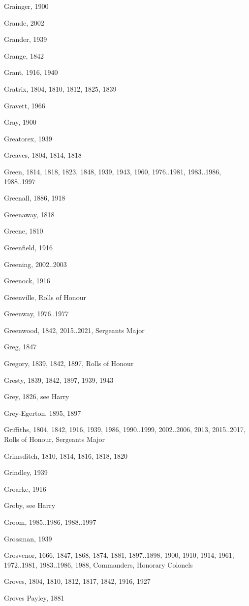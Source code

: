 {\begin{theindex}
\item Grainger, 1900
\item Grande, 2002
\item Grander, 1939
\item Grange, 1842
\item Grant, 1916, 1940
\item Gratrix, 1804, 1810, 1812, 1825, 1839
\item Gravett, 1966
\item Gray, 1900
\item Greatorex, 1939
\item Greaves, 1804, 1814, 1818
\item Green, 1814, 1818, 1823, 1848, 1939, 1943, 1960, 1976..1981, 1983..1986, 1988..1997
\item Greenall, 1886, 1918
\item Greenaway, 1818
\item Greene, 1810
\item Greenfield, 1916
\item Greening, 2002..2003
\item Greenock, 1916
\item Greenville, Rolls of Honour
\item Greenway, 1976..1977
\item Greenwood, 1842, 2015..2021, Sergeants Major
\item Greg, 1847
\item Gregory, 1839, 1842, 1897, Rolls of Honour
\item Gresty, 1839, 1842, 1897, 1939, 1943
\item Grey, 1826, see Harry
\item Grey-Egerton, 1895, 1897
\item Griffiths, 1804, 1842, 1916, 1939, 1986, 1990..1999, 2002..2006, 2013, 2015..2017, Rolls of Honour, Sergeants Major
\item Grimsditch, 1810, 1814, 1816, 1818, 1820
\item Grindley, 1939
\item Groarke, 1916
\item Groby, see Harry
\item Groom, 1985..1986, 1988..1997
\item Grossman, 1939
\item Grosvenor, 1666, 1847, 1868, 1874, 1881, 1897..1898, 1900, 1910, 1914, 1961, 1972..1981, 1983..1986, 1988, Commanders, Honorary Colonels
\item Groves, 1804, 1810, 1812, 1817, 1842, 1916, 1927
\item Groves Payley, 1881

\end{theindex}}
